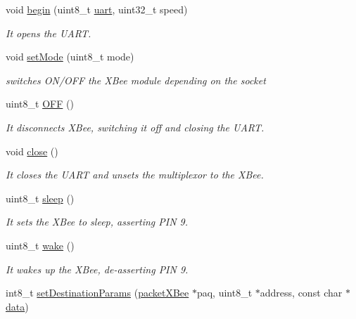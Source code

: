\begin{DoxyCompactItemize}
void \hyperlink{class_wasp_x_bee_core_ab0922c788318a386052fea2518c0155f}{begin} (uint8\+\_\+t \hyperlink{class_wasp_x_bee_core_a1b31c62bcb1bb1e6080ddc668419f729}{uart}, uint32\+\_\+t speed)
\begin{DoxyCompactList}\small\item\em It opens the U\+A\+RT. \end{DoxyCompactList}\item 
void \hyperlink{class_wasp_x_bee_core_a83897cc127e0a5862d4a18e1a980e7ab}{set\+Mode} (uint8\+\_\+t mode)
\begin{DoxyCompactList}\small\item\em switches O\+N/\+O\+FF the X\+Bee module depending on the socket \end{DoxyCompactList}\item 
uint8\+\_\+t \hyperlink{class_wasp_x_bee_core_a41b7624ea71c7e8a8ce66beb2ce7bcb0}{O\+FF} ()
\begin{DoxyCompactList}\small\item\em It disconnects X\+Bee, switching it off and closing the U\+A\+RT. \end{DoxyCompactList}\item 
void \hyperlink{class_wasp_x_bee_core_a5913f875169377f3bfcf93458208f990}{close} ()
\begin{DoxyCompactList}\small\item\em It closes the U\+A\+RT and unsets the multiplexor to the X\+Bee. \end{DoxyCompactList}\item 
uint8\+\_\+t \hyperlink{class_wasp_x_bee_core_a15dbaf3f5f69b1400a4b39b2136c6536}{sleep} ()
\begin{DoxyCompactList}\small\item\em It sets the X\+Bee to sleep, asserting P\+IN 9. \end{DoxyCompactList}\item 
uint8\+\_\+t \hyperlink{class_wasp_x_bee_core_ae562c7cfec273abe61a2e5fe16f9626a}{wake} ()
\begin{DoxyCompactList}\small\item\em It wakes up the X\+Bee, de-\/asserting P\+IN 9. \end{DoxyCompactList}\item 
int8\+\_\+t \hyperlink{class_wasp_x_bee_core_a663cf4fdf59c9c014871fe80540ebd7b}{set\+Destination\+Params} (\hyperlink{structpacket_x_bee}{packet\+X\+Bee} $\ast$paq, uint8\+\_\+t $\ast$address, const char $\ast$\hyperlink{class_wasp_x_bee_core_a81f1c2af5c45fc8e3b63f8f21b3df17f}{data})

\end{DoxyCompactItemize}
